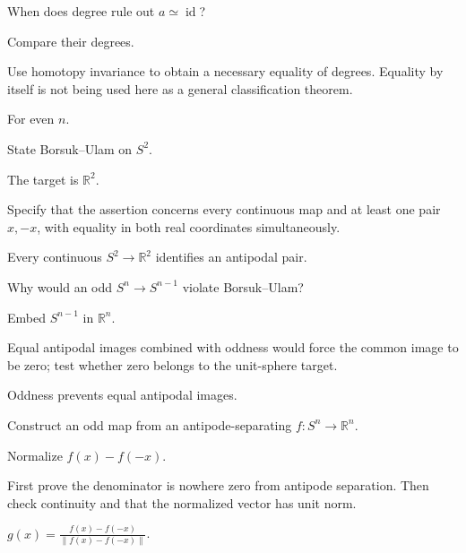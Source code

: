 \begin{exercise}\label{exr:viii04-05}
When does degree rule out \(a\simeq\operatorname{id}\)?
\end{exercise}
\begin{hint}
Compare their degrees.

Use homotopy invariance to obtain a necessary equality of degrees. Equality by itself is not being used here as a general classification theorem.
\end{hint}
\begin{solution}
For even \(n\).
\end{solution}

\begin{exercise}\label{exr:viii04-06}
State Borsuk--Ulam on \(S^2\).
\end{exercise}
\begin{hint}
The target is \(\mathbb R^2\).

Specify that the assertion concerns every continuous map and at least one pair \(x,-x\), with equality in both real coordinates simultaneously.
\end{hint}
\begin{solution}
Every continuous \(S^2\to\mathbb R^2\) identifies an antipodal pair.
\end{solution}

\begin{exercise}\label{exr:viii04-07}
Why would an odd \(S^n\to S^{n-1}\) violate Borsuk--Ulam?
\end{exercise}
\begin{hint}
Embed \(S^{n-1}\) in \(\mathbb R^n\).

Equal antipodal images combined with oddness would force the common image to be zero; test whether zero belongs to the unit-sphere target.
\end{hint}
\begin{solution}
Oddness prevents equal antipodal images.
\end{solution}

\begin{exercise}\label{exr:viii04-08}
Construct an odd map from an antipode-separating \(f:S^n\to\mathbb R^n\).
\end{exercise}
\begin{hint}
Normalize \(f(x)-f(-x)\).

First prove the denominator is nowhere zero from antipode separation. Then check continuity and that the normalized vector has unit norm.
\end{hint}
\begin{solution}
\(g(x)=\frac{f(x)-f(-x)}{\|f(x)-f(-x)\|}\).
\end{solution}

